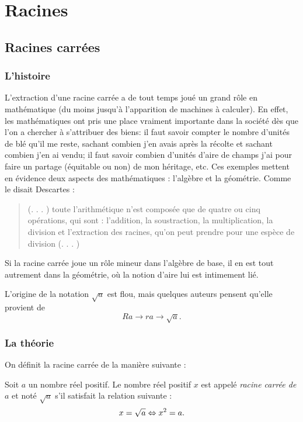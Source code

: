 \chapter{Racines}

\section{Racines carrées}

\subsection{L'histoire}

L'extraction d'une racine carrée a de tout temps joué un grand rôle en mathématique (du moins jusqu'à l'apparition de machines à calculer). En effet, les mathématiques ont pris une place vraiment importante dans la société dès que l'on a chercher à s'attribuer des biens: il faut savoir compter le nombre d'unités de blé qu'il me reste, sachant combien j'en avais après la récolte et sachant combien j'en ai vendu; il faut savoir combien d'unités d'aire de champs j'ai pour faire un partage (équitable ou non) de mon héritage, etc. Ces exemples mettent en évidence deux aspects des mathématiques : l'algèbre et la géométrie. Comme le disait Descartes \cite{Descartes}:
\begin{quotation}
(. . . ) toute l’arithmétique n’est composée que de quatre ou cinq opérations, qui
sont : l’addition, la soustraction, la multiplication, la division et l’extraction des
racines, qu’on peut prendre pour une espèce de division (. . . )
\end{quotation}
Si la racine carrée joue un rôle mineur dans l'algèbre de base, il en est tout autrement dans la géométrie, où la notion d'aire lui est intimement lié.

L'origine de la notation $\sqrt{a}$ est flou, mais quelques auteurs \cite{Euler} pensent qu'elle provient de 
$$
Ra \rightarrow ra \rightarrow \sqrt{a}.
$$

\subsection{La théorie}

On définit la racine carrée de la manière suivante :

\begin{definition}
Soit $a$ un nombre réel positif. Le nombre réel positif $x$ est appelé \emph{racine carrée de $a$} et noté $\sqrt{a}$ s'il satisfait la relation suivante :
$$
x = \sqrt{a} \Leftrightarrow x^2 = a.
$$
\end{definition}

